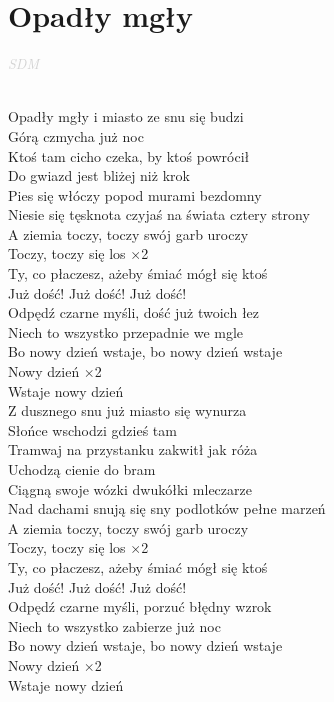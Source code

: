 \documentclass[a5paper, 10pt]{book}
\begin{document}
\newpage
\section{Opadły mgły}\textcolor{lightgray}{\textit{SDM}}\\~\\
\begin{minipage}[t]{0.7\textwidth}
  Opadły mgły i miasto ze snu się budzi\\
  Górą czmycha już noc\\
  Ktoś tam cicho czeka, by ktoś powrócił\\
  Do gwiazd jest bliżej niż krok\\
  Pies się włóczy popod murami bezdomny\\
  Niesie się tęsknota czyjaś na świata cztery strony\\

  A ziemia toczy, toczy swój garb uroczy\\
  Toczy, toczy się los
  \hspace*{5mm} $\times $2\\

  Ty, co płaczesz, ażeby śmiać mógł się ktoś\\
  Już dość! Już dość! Już dość!\\
  Odpędź czarne myśli, dość już twoich łez\\
  Niech to wszystko przepadnie we mgle\\

  Bo nowy dzień wstaje, bo nowy dzień wstaje\\
  Nowy dzień \hspace*{16mm} $\times $2\\
  Wstaje nowy dzień\\

  Z dusznego snu już miasto się wynurza\\
  Słońce wschodzi gdzieś tam\\
  Tramwaj na przystanku zakwitł jak róża\\
  Uchodzą cienie do bram\\
  Ciągną swoje wózki dwukółki mleczarze\\
  Nad dachami snują się sny podlotków pełne marzeń\\

  A ziemia toczy, toczy swój garb uroczy\\
  Toczy, toczy się los
  \hspace*{5mm} $\times $2\\

  Ty, co płaczesz, ażeby śmiać mógł się ktoś\\
  Już dość! Już dość! Już dość!\\
  Odpędź czarne myśli, porzuć błędny wzrok\\
  Niech to wszystko zabierze już noc\\

  Bo nowy dzień wstaje, bo nowy dzień wstaje\\
  Nowy dzień \hspace*{15mm} $\times $2\\
  Wstaje nowy dzień\\
\end{minipage}
\end{document}
